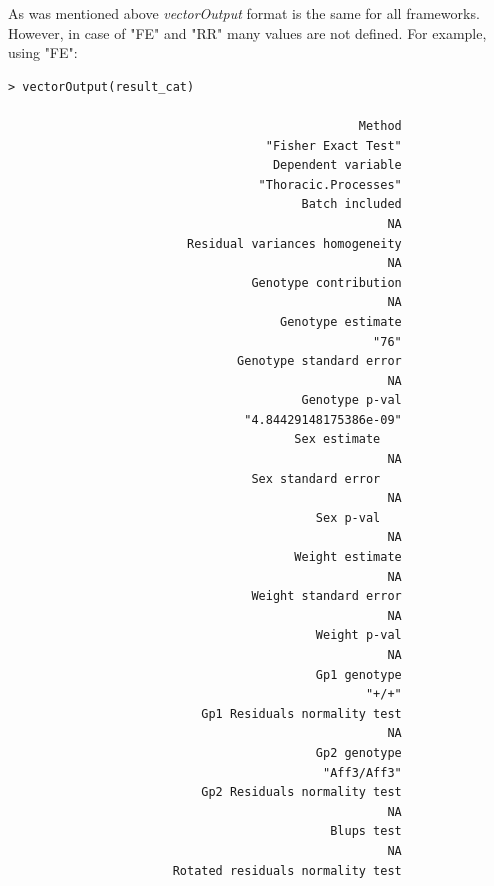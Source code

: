 \documentclass[12pt,a4paper]{article}
\begin{document}
As was mentioned above \textit{vectorOutput} format is the same for all frameworks. However, in case of "FE" and "RR" many values are not defined. For example, using "FE":

\begingroup
    \fontsize{8pt}{12pt}\selectfont
\begin{verbatim}
> vectorOutput(result_cat)

                                                 Method 
                                    "Fisher Exact Test" 
                                     Dependent variable 
                                   "Thoracic.Processes" 
                                         Batch included 
                                                     NA 
                         Residual variances homogeneity 
                                                     NA 
                                  Genotype contribution 
                                                     NA 
                                      Genotype estimate 
                                                   "76" 
                                Genotype standard error 
                                                     NA 
                                         Genotype p-val 
                                 "4.84429148175386e-09" 
                                        Sex estimate 
                                                     NA 
                                  Sex standard error 
                                                     NA 
                                           Sex p-val 
                                                     NA 
                                        Weight estimate 
                                                     NA 
                                  Weight standard error 
                                                     NA 
                                           Weight p-val 
                                                     NA 
                                           Gp1 genotype 
                                                  "+/+" 
                           Gp1 Residuals normality test 
                                                     NA 
                                           Gp2 genotype 
                                            "Aff3/Aff3" 
                           Gp2 Residuals normality test 
                                                     NA 
                                             Blups test 
                                                     NA 
                       Rotated residuals normality test 

\end{verbatim}
\end{document}
